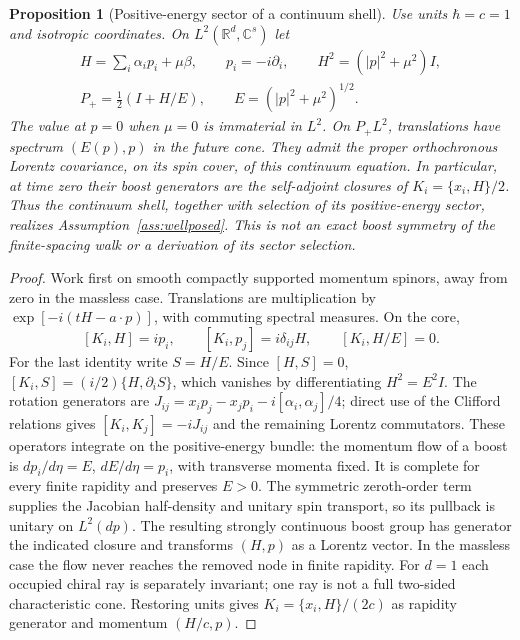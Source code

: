 \documentclass[12pt,a4paper]{article}
\newtheorem{proposition}[theorem]{Proposition}
\theoremstyle{definition}
\theoremstyle{remark}
\begin{document}
\begin{proposition}[Positive-energy sector of a continuum shell]
\label{prop:positive-sector}
Use units $\hbar=c=1$ and isotropic coordinates. On $L^2(\mathbb R^d,\mathbb C^s)$ let
\begin{gather*}
 H=\sum_i\alpha_i p_i+\mu\beta,\qquad p_i=-i\partial_i,\qquad
 H^2=(|p|^2+\mu^2)I,\\
 P_+=\tfrac12(I+H/E),\qquad E=(|p|^2+\mu^2)^{1/2}.
\end{gather*}
The value at $p=0$ when $\mu=0$ is immaterial in $L^2$.
On $P_+L^2$, translations have spectrum $(E(p),p)$ in the future cone.
They admit the proper orthochronous Lorentz covariance, on its spin cover, of this continuum
equation. In particular, at time zero their boost generators are the
self-adjoint closures of $K_i=\{x_i,H\}/2$. Thus the continuum shell,
together with selection of its positive-energy sector, realizes
Assumption~\ref{ass:wellposed}. This is not an exact boost symmetry of the
finite-spacing walk or a derivation of its sector selection.
\end{proposition}
\begin{proof}
Work first on smooth compactly supported momentum spinors, away from zero
in the massless case. Translations are multiplication by
$\exp[-i(tH-a\cdot p)]$, with commuting spectral measures. On the core,
\[
 [K_i,H]=ip_i,\qquad [K_i,p_j]=i\delta_{ij}H,\qquad
 [K_i,H/E]=0 .
\]
For the last identity write $S=H/E$. Since $[H,S]=0$,
$[K_i,S]=(i/2)\{H,\partial_iS\}$, which vanishes by differentiating
$H^2=E^2I$. The rotation generators are
$J_{ij}=x_ip_j-x_jp_i-i[\alpha_i,\alpha_j]/4$; direct use of the Clifford
relations gives $[K_i,K_j]=-iJ_{ij}$ and the remaining Lorentz commutators.
These operators integrate on the positive-energy bundle: the momentum
flow of a boost is $dp_i/d\eta=E$, $dE/d\eta=p_i$, with transverse
momenta fixed. It is complete for every finite rapidity and preserves
$E>0$. The symmetric zeroth-order term supplies the Jacobian half-density
and unitary spin transport, so its pullback is unitary on $L^2(dp)$.
The resulting strongly continuous boost group has generator the indicated
closure and transforms $(H,p)$ as a Lorentz vector. In the massless case
the flow never reaches the removed node in finite rapidity. For $d=1$
each occupied chiral ray is separately invariant; one ray is not a full
two-sided characteristic cone. Restoring units gives
$K_i=\{x_i,H\}/(2c)$ as rapidity generator and momentum $(H/c,p)$.
\end{proof}
\end{document}
